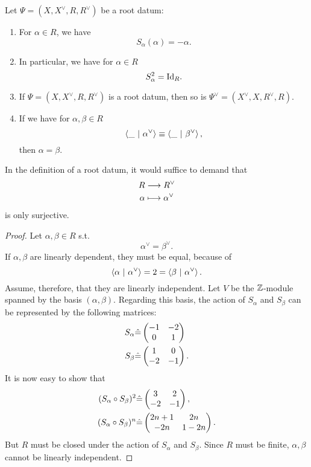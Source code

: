 \begin{remark}
	Let $\Psi = (X, X^\vee, R, R^\vee)$ be a root datum:
	\begin{enumerate}
		\item For $\alpha \in R$, we have
		\[ S_\alpha(\alpha) = - \alpha. \]
		\item In particular, we have for $\alpha \in R$
		\[S_\alpha^2 = \text{Id}_{R}. \]
		\item If $\Psi = (X, X^\vee, R, R^\vee)$ is a root datum, then so is $\Psi^\vee = (X^\vee, X, R^\vee, R)$.
		\item If we have for $\alpha, \beta \in R$
		\[ \left<\_ ~ | ~ \alpha^\vee\right> \equiv \left<\_ ~ | ~ \beta^\vee\right>, \]
		then $\alpha = \beta$.
	\end{enumerate}
\end{remark}

\begin{lemma}
	In the definition of a root datum, it would suffice to demand that
	\begin{align*}
	R & \overset{}{\longrightarrow} R^\vee\\
	\alpha & \longmapsto \alpha^\vee
	\end{align*}
	is only surjective.
\end{lemma}
\begin{proof}
	Let $\alpha, \beta \in R$ s.t.
	\[ \alpha^\vee = \beta^\vee. \]
	If $\alpha, \beta$ are linearly dependent, they must be equal, because of
	\[ \left<\alpha ~ | ~ \alpha^\vee\right> =2= \left<\beta ~ | ~ \alpha^\vee\right>. \]
	Assume, therefore, that they are linearly independent. Let $V$ be the $\mathbb{Z}$-module spanned by the basis $(\alpha, \beta)$. Regarding this basis, the action of $S_\alpha$ and $S_\beta$ can be represented by the following matrices:
	\begin{align*}
	S_\alpha &\hat{=} \left(\begin{matrix} -1 & -2 \\ 0 & 1 \end{matrix}\right)\\
	S_\beta &\hat{=} \left(\begin{matrix} 1 & 0 \\ -2 & -1 \end{matrix}\right).
	\end{align*}
	It is now easy to show that
		\begin{align*}
	(S_\alpha \circ S_\beta)^2 &\hat{=} \left(\begin{matrix} 3 & 2 \\ -2 & -1 \end{matrix}\right),\\
	(S_\alpha \circ S_\beta)^n &\hat{=} \left(\begin{matrix} 2n + 1 & 2n \\ -2n & 1 - 2n \end{matrix}\right).
	\end{align*}
	But $R$ must be closed under the action of $S_\alpha$ and $S_\beta$. Since $R$ must be finite, $\alpha, \beta$ cannot be linearly independent.
\end{proof}

